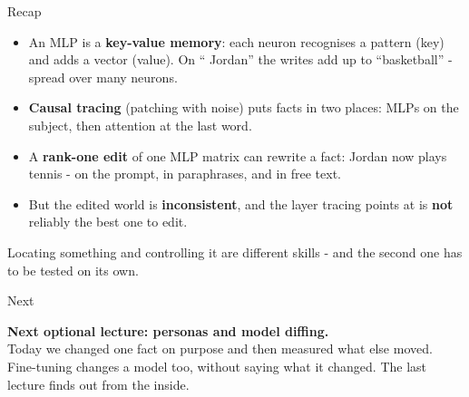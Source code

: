 \documentclass[aspectratio=169]{beamer}
\newcommand{\takebox}[1]{%
  \begin{tcolorbox}[colback=paramgreen!8, colframe=paramgreen, boxrule=0.6pt, arc=2pt]
  #1
  \end{tcolorbox}}
\begin{document}
\begin{frame}{Recap}
  \vspace{0.3em}
  \begin{itemize}
    \item An MLP is a \textbf{key-value memory}: each neuron recognises a pattern (key) and adds a
      vector (value). On `` Jordan'' the writes add up to ``basketball'' - spread over many neurons.
    \item \textbf{Causal tracing} (patching with noise) puts facts in two places: MLPs on the
      subject, then attention at the last word.
    \item A \textbf{rank-one edit} of one MLP matrix can rewrite a fact: Jordan now plays tennis - on the prompt, in paraphrases, and in free text.
    \item But the edited world is \textbf{inconsistent}, and the layer tracing points at is
      \textbf{not} reliably the best one to edit.
  \end{itemize}

  \vspace{0.4em}
  \takebox{\small Locating something and controlling it are different skills - and the second one
  has to be tested on its own.}
\end{frame}

\begin{frame}{Next}
  \vspace{1.2em}
  \takebox{\textbf{Next optional lecture: personas and model diffing.}\\[0.6em]
  Today we changed one fact on purpose and then measured what else moved. Fine-tuning changes a
  model too, without saying what it changed. The last lecture finds out from the inside.}
\end{frame}
\end{document}
